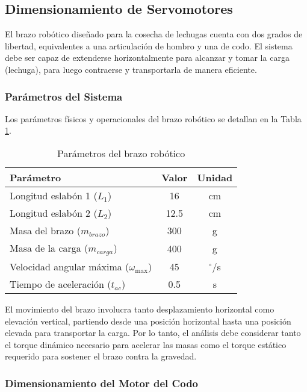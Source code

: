 \subsection{Dimensionamiento de Servomotores}

El brazo robótico diseñado para la cosecha de lechugas cuenta con dos grados de libertad, equivalentes a una articulación de hombro y una de codo. El sistema debe ser capaz de extenderse horizontalmente para alcanzar y tomar la carga (lechuga), para luego contraerse y transportarla de manera eficiente.

\subsubsection{Parámetros del Sistema}

Los parámetros físicos y operacionales del brazo robótico se detallan en la Tabla \ref{tab:parametros_brazo}.

\begin{table}[htbp]
\centering
\caption{Parámetros del brazo robótico}
\label{tab:parametros_brazo}
\begin{tabular}{lcc}
\hline
\textbf{Parámetro} & \textbf{Valor} & \textbf{Unidad} \\
\hline
Longitud eslabón 1 ($L_1$) & 16 & cm \\
Longitud eslabón 2 ($L_2$) & 12.5 & cm \\
Masa del brazo ($m_{brazo}$) & 300 & g \\
Masa de la carga ($m_{carga}$) & 400 & g \\
Velocidad angular máxima ($\omega_{\max}$) & 45 & $^{\circ}$/s \\
Tiempo de aceleración ($t_{ac}$) & 0.5 & s \\
\hline
\end{tabular}
\end{table}

El movimiento del brazo involucra tanto desplazamiento horizontal como elevación vertical, partiendo desde una posición horizontal hasta una posición elevada para transportar la carga. Por lo tanto, el análisis debe considerar tanto el torque dinámico necesario para acelerar las masas como el torque estático requerido para sostener el brazo contra la gravedad.

\subsubsection{Dimensionamiento del Motor del Codo}

